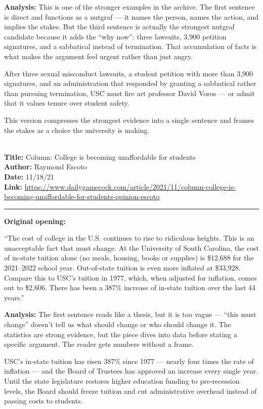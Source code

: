 \documentclass[12pt]{article}
\newcounter{examplenum}
\newcommand{\totalexamples}{10}
\newcommand{\exampleheader}[4]{%
    \newpage
    \stepcounter{examplenum}%
    \noindent{\large\bfseries\color{garnet} Example \theexamplenum\ of \totalexamples}\\[6pt]
    \textbf{Title:} #1\\
    \textbf{Author:} #2\\
    \textbf{Date:} #3\\
    \textbf{Link:} \url{#4}\\[4pt]
    \noindent\rule{\textwidth}{0.4pt}
    \vspace{6pt}
}
\begin{document}
\textbf{Analysis:} This is one of the stronger examples in the archive. The first sentence is direct and functions as a nutgraf --- it names the person, names the action, and implies the stakes. But the third sentence is actually the strongest nutgraf candidate because it adds the ``why now'': three lawsuits, 3,900 petition signatures, and a sabbatical instead of termination. That accumulation of facts is what makes the argument feel urgent rather than just angry.

\begin{seasonbox}
After three sexual misconduct lawsuits, a student petition with more than 3,900 signatures, and an administration that responded by granting a sabbatical rather than pursuing termination, USC must fire art professor David Voros --- or admit that it values tenure over student safety.
\end{seasonbox}

This version compresses the strongest evidence into a single sentence and frames the stakes as a choice the university is making.

\exampleheader{Column: College is becoming unaffordable for students}{Raymond Escoto}{11/18/21}{https://www.dailygamecock.com/article/2021/11/column-college-is-becoming-unaffordable-for-students-opinion-escoto}

\begin{promptbox}
\textbf{Original opening:}

``The cost of college in the U.S. continues to rise to ridiculous heights. This is an unacceptable fact that must change. At the University of South Carolina, the cost of in-state tuition alone (no meals, housing, books or supplies) is \$12,688 for the 2021--2022 school year. Out-of-state tuition is even more inflated at \$33,928. Compare this to USC's tuition in 1977, which, when adjusted for inflation, comes out to \$2,606. There has been a 387\% increase of in-state tuition over the last 44 years.''
\end{promptbox}

\textbf{Analysis:} The first sentence reads like a thesis, but it is too vague --- ``this must change'' doesn't tell us what should change or who should change it. The statistics are strong evidence, but the piece dives into data before stating a specific argument. The reader gets numbers without a frame.

\begin{seasonbox}
USC's in-state tuition has risen 387\% since 1977 --- nearly four times the rate of inflation --- and the Board of Trustees has approved an increase every single year. Until the state legislature restores higher education funding to pre-recession levels, the Board should freeze tuition and cut administrative overhead instead of passing costs to students.
\end{seasonbox}
\end{document}
